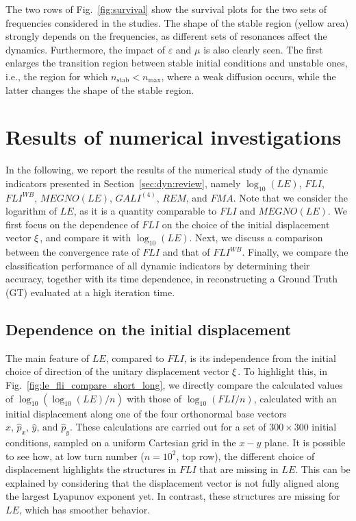 %
The two rows of Fig.~\ref{fig:survival} show the survival plots for the two sets of frequencies considered in the studies. The shape of the stable region (yellow area) strongly depends on the frequencies, as different sets of resonances affect the dynamics. Furthermore, the impact of $\varepsilon$ and $\mu$ is also clearly seen. The first enlarges the transition region between stable initial conditions and unstable ones, i.e., the region for which $n_\mathrm{stab} < n_\mathrm{max}$, where a weak diffusion occurs, while the latter changes the shape of the stable region.
%
\section{\label{sec:dyn:results} Results of numerical investigations}
%
In the following, we report the results of the numerical study of the dynamic indicators presented in Section~\ref{sec:dyn:review}, namely $\log_{10}(LE)$, $FLI$, $FLI^{WB}$, $MEGNO(LE)$, $GALI^{(4)}$, $REM$, and $FMA$. Note that we consider the logarithm of $LE$, as it is a quantity comparable to $FLI$ and $MEGNO(LE)$. We first focus on the dependence of $FLI$ on the choice of the initial displacement vector $\vb{\xi}$, and compare it with $\log_{10}(LE)$. Next, we discuss a comparison between the convergence rate of $FLI$ and that of $FLI^{WB}$. Finally, we compare the classification performance of all dynamic indicators by determining their accuracy, together with its time dependence, in reconstructing a Ground Truth (GT) evaluated at a high iteration time.
%
\subsection{Dependence on the initial displacement}

The main feature of $LE$, compared to $FLI$, is its independence from the initial choice of direction of the unitary displacement vector $\vb{\xi}$. To highlight this, in Fig.~\ref{fig:le_fli_compare_short_long}, we directly compare the calculated values of $\log_{10}(\log_{10}(LE)/n)$ with those of $\log_{10}(FLI/n)$, calculated with an initial displacement along one of the four orthonormal base vectors $\hat{x},\,\hat{p}_x,\,\hat{y},\,\text{and }\hat{p}_y$. These calculations are carried out for a set of $300\times300$ initial conditions, sampled on a uniform Cartesian grid in the $x-y$ plane. It is possible to see how, at low turn number ($n=10^2$, top row), the different choice of displacement highlights the structures in $FLI$ that are missing in $LE$. This can be explained by considering that the displacement vector is not fully aligned along the largest Lyapunov exponent yet. In contrast, these structures are missing for $LE$, which has smoother behavior.


